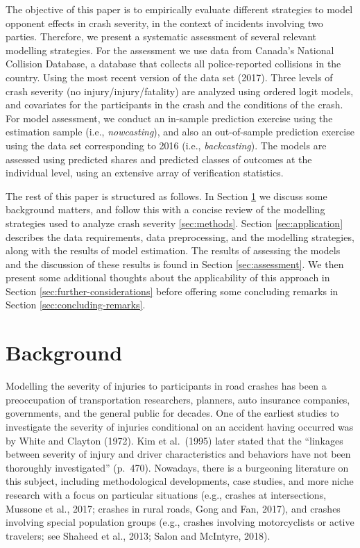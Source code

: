 \documentclass[]{elsarticle} %
\begin{document}
The objective of this paper is to empirically evaluate different
strategies to model opponent effects in crash severity, in the context
of incidents involving two parties. Therefore, we present a systematic
assessment of several relevant modelling strategies. For the assessment
we use data from Canada's National Collision Database, a database that
collects all police-reported collisions in the country. Using the most
recent version of the data set (2017). Three levels of crash severity
(no injury/injury/fatality) are analyzed using ordered logit models, and
covariates for the participants in the crash and the conditions of the
crash. For model assessment, we conduct an in-sample prediction exercise
using the estimation sample (i.e., \emph{nowcasting}), and also an
out-of-sample prediction exercise using the data set corresponding to
2016 (i.e., \emph{backcasting}). The models are assessed using predicted
shares and predicted classes of outcomes at the individual level, using
an extensive array of verification statistics.

The rest of this paper is structured as follows. In Section
\ref{sec:background} we discuss some background matters, and follow this
with a concise review of the modelling strategies used to analyze crash
severity \ref{sec:methods}. Section \ref{sec:application} describes the
data requirements, data preprocessing, and the modelling strategies,
along with the results of model estimation. The results of assessing the
models and the discussion of these results is found in Section
\ref{sec:assessment}. We then present some additional thoughts about the
applicability of this approach in Section
\ref{sec:further-considerations} before offering some concluding remarks
in Section \ref{sec:concluding-remarks}.

\hypertarget{sec:background}{%
\section{Background}\label{sec:background}}

Modelling the severity of injuries to participants in road crashes has
been a preoccupation of transportation researchers, planners, auto
insurance companies, governments, and the general public for decades.
One of the earliest studies to investigate the severity of injuries
conditional on an accident having occurred was by White and Clayton
(1972). Kim et al.~(1995) later stated that the ``linkages between
severity of injury and driver characteristics and behaviors have not
been thoroughly investigated'' (p.~470). Nowadays, there is a burgeoning
literature on this subject, including methodological developments, case
studies, and more niche research with a focus on particular situations
(e.g., crashes at intersections, Mussone et al., 2017; crashes in rural
roads, Gong and Fan, 2017), and crashes involving special population
groups (e.g., crashes involving motorcyclists or active travelers; see
Shaheed et al., 2013; Salon and McIntyre, 2018).
\end{document}
